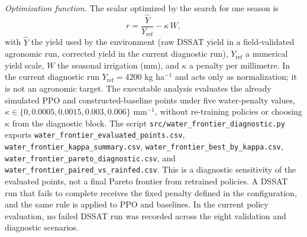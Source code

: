 \documentclass[times,final,authoryear]{elsarticle}
\begin{document}
\emph{Optimization function.} The scalar optimized by the search for one season is
\begin{equation}
r = \frac{\hat{Y}}{Y_{\text{ref}}} - \kappa\, W,
\label{eq_reward}
\end{equation}
with $\hat{Y}$ the yield used by the environment (raw DSSAT yield in a field-validated agronomic run, corrected yield in the current diagnostic run), $Y_{\text{ref}}$ a numerical yield scale, $W$ the seasonal irrigation (mm), and $\kappa$ a penalty per millimetre. In the current diagnostic run $Y_{\text{ref}}=4200$ kg ha$^{-1}$ and acts only as normalization; it is not an agronomic target. The executable analysis evaluates the already simulated PPO and constructed-baseline points under five water-penalty values, $\kappa \in \{0, 0.0005, 0.0015, 0.003, 0.006\}$ mm$^{-1}$, without re-training policies or choosing $\kappa$ from the diagnostic block. The script \texttt{src/water\_frontier\_diagnostic.py} exports \texttt{water\_frontier\_evaluated\_points.csv}, \texttt{water\_frontier\_kappa\_summary.csv}, \texttt{water\_frontier\_best\_by\_kappa.csv}, \texttt{water\_frontier\_pareto\_diagnostic.csv}, and \texttt{water\_frontier\_paired\_vs\_rainfed.csv}. This is a diagnostic sensitivity of the evaluated points, not a final Pareto frontier from retrained policies. A DSSAT run that fails to complete receives the fixed penalty defined in the configuration, and the same rule is applied to PPO and baselines. In the current policy evaluation, no failed DSSAT run was recorded across the eight validation and diagnostic scenarios.
\end{document}
